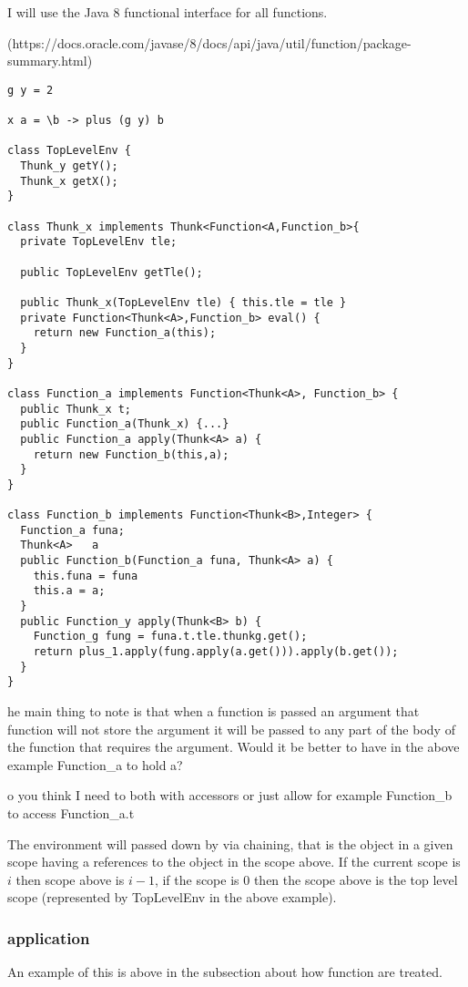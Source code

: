 \documentclass[12pt,a4paper,twoside]{article}
\def\comment#1\done{{\color{blue}#1}}
\begin{document}
I will use the Java 8 functional interface for all functions.

(https://docs.oracle.com/javase/8/docs/api/java/util/function/package-summary.html)

\begin{verbatim}
g y = 2
  
x a = \b -> plus (g y) b

class TopLevelEnv {
  Thunk_y getY();
  Thunk_x getX();
}

class Thunk_x implements Thunk<Function<A,Function_b>{
  private TopLevelEnv tle;

  public TopLevelEnv getTle();

  public Thunk_x(TopLevelEnv tle) { this.tle = tle }
  private Function<Thunk<A>,Function_b> eval() {
    return new Function_a(this);
  }
}

class Function_a implements Function<Thunk<A>, Function_b> {
  public Thunk_x t; 
  public Function_a(Thunk_x) {...}
  public Function_a apply(Thunk<A> a) {
    return new Function_b(this,a);
  }
}

class Function_b implements Function<Thunk<B>,Integer> {
  Function_a funa;
  Thunk<A>   a
  public Function_b(Function_a funa, Thunk<A> a) {
    this.funa = funa
    this.a = a;
  }
  public Function_y apply(Thunk<B> b) {
    Function_g fung = funa.t.tle.thunkg.get();
    return plus_1.apply(fung.apply(a.get())).apply(b.get());
  }
}
\end{verbatim}

\comment The main thing to note is that when a function is passed an argument that function will not store the argument it will be
passed to any part of the body of the function that requires the argument. Would it be better to have in the above 
example Function\_a to hold a?\done

\comment Do you think I need to both with accessors or just allow for example Function\_b to access Function\_a.t\done

The environment will passed down by via chaining, that is the object in a given scope
having a references to the object in the scope above. If the current scope is $i$ then scope above is
$i-1$, if the scope is $0$ then the scope above is the top level scope (represented by TopLevelEnv in the above example).


\subsubsection{application}

An example of this is above in the subsection about how function are treated.
\end{document}
